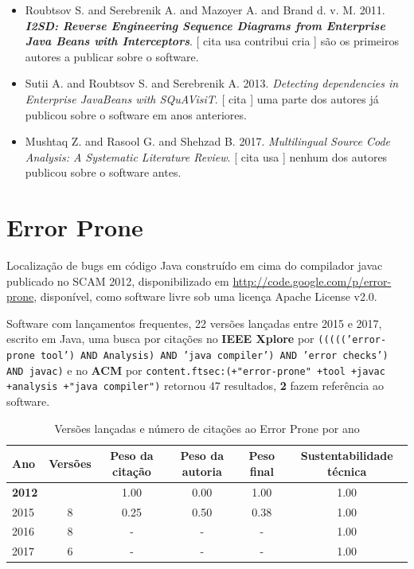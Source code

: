 \begin{itemize}
\item Roubtsov S. and Serebrenik A. and Mazoyer A. and Brand d. v. M.
      2011.
        \textbf{\textit{ I2SD: Reverse Engineering Sequence Diagrams from Enterprise Java Beans with Interceptors}}.
      [
          cita
          usa
          contribui
          cria
      ]
são os primeiros autores a publicar sobre o software.
\item Sutii A. and Roubtsov S. and Serebrenik A.
      2013.
        \textit{ Detecting dependencies in Enterprise JavaBeans with SQuAVisiT}.
      [
          cita
      ]
uma parte dos autores já publicou sobre o software em anos anteriores.
\item Mushtaq Z. and Rasool G. and Shehzad B.
      2017.
        \textit{ Multilingual Source Code Analysis: A Systematic Literature Review}.
      [
          cita
          usa
      ]
nenhum dos autores publicou sobre o software antes.
\end{itemize}
\section{Error Prone}

Localização de bugs em código Java construído em cima do compilador javac
publicado no SCAM 2012,
disponibilizado em \url{http://code.google.com/p/error-prone},
disponível,
como software livre
sob uma licença Apache License v2.0.

Software com lançamentos frequentes,
22 versões lançadas
entre 2015 e 2017,
escrito em Java,
uma busca por citações no {\bf IEEE Xplore} por
\texttt{((((('error-prone tool') AND Analysis) AND 'java compiler') AND 'error checks') AND javac)}
e no {\bf ACM} por
\texttt{content.ftsec:(+"error-prone" +tool +javac +analysis +"java compiler")}
retornou
47 resultados,
{\bf 2} fazem referência ao software.


\begin{table}[H]
\caption{Versões lançadas e número de citações ao Error Prone por ano}
\centering
\begin{tabular}{| l | c | c | c | c | c |}
  \hline
  Ano & Versões & Peso da citação & Peso da autoria & Peso final & Sustentabilidade técnica \\
  \hline
            {\bf 2012}
          &
          
          &
          1.00
          &
          0.00
          &
          1.00
          &
            {\color{blue} 1.00}
          \\
\hline
            2015
          &
          8
          &
          0.25
          &
          0.50
          &
          0.38
          &
            {\color{blue} 1.00}
          \\
\hline
        2016 & 8 & - & - & -
        &
          {\color{blue} 1.00}
        \\
\hline
        2017 & 6 & - & - & -
        &
          {\color{blue} 1.00}
        \\
\hline
\end{tabular}
\end{table}

